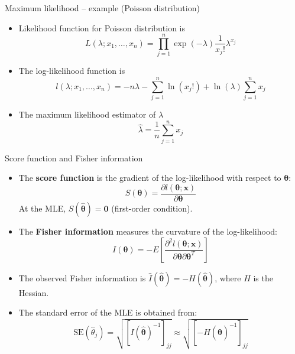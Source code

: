 \documentclass[10pt,ignorenonframetext,aspectratio=169]{beamer}
\begin{document}
\begin{frame}{Maximum likelihood -- example (Poisson distribution)}

\begin{itemize}
    \item Likelihood function for Poisson distribution is
    \begin{equation}
        L\left(\lambda ; x_{1}, \ldots, x_{n}\right)=\prod_{j=1}^{n} \exp (-\lambda) \frac{1}{x_{j} !} \lambda^{x_{j}}
    \end{equation}
    \item The log-likelihood function is
    \begin{equation}
        l\left(\lambda ; x_{1}, \ldots, x_{n}\right)=-n \lambda-\sum_{j=1}^{n} \ln \left(x_{j} !\right)+\ln (\lambda) \sum_{j=1}^{n} x_{j}
        \end{equation}
    \item The maximum likelihood estimator of $\lambda$
    \begin{equation}
        \hat{\lambda}=\frac{1}{n} \sum_{j=1}^{n} x_{j}
    \end{equation}
\end{itemize}
\end{frame}

\begin{frame}{Score function and Fisher information}
\begin{itemize}
    \item The \textbf{score function} is the gradient of the log-likelihood with respect to $\boldsymbol{\theta}$:
    \begin{equation}
        S(\boldsymbol{\theta}) = \frac{\partial l(\boldsymbol{\theta}; \mathbf{x})}{\partial \boldsymbol{\theta}}
    \end{equation}
    At the MLE, $S(\hat{\boldsymbol{\theta}}) = \boldsymbol{0}$ (first-order condition).
    \item The \textbf{Fisher information} measures the curvature of the log-likelihood:
    \begin{equation}
        I(\boldsymbol{\theta}) = -E\left[\frac{\partial^2 l(\boldsymbol{\theta}; \mathbf{x})}{\partial \boldsymbol{\theta} \partial \boldsymbol{\theta}^T}\right]
    \end{equation}
    \item The observed Fisher information is $\hat{I}(\hat{\boldsymbol{\theta}}) = -H(\hat{\boldsymbol{\theta}})$, where $H$ is the Hessian.
    \item The standard error of the MLE is obtained from:
    \begin{equation}
        \text{SE}(\hat{\theta}_j) = \sqrt{\left[I(\hat{\boldsymbol{\theta}})^{-1}\right]_{jj}} \approx \sqrt{\left[-H(\hat{\boldsymbol{\theta}})^{-1}\right]_{jj}}
    \end{equation}
\end{itemize}
\end{frame}
\end{document}

